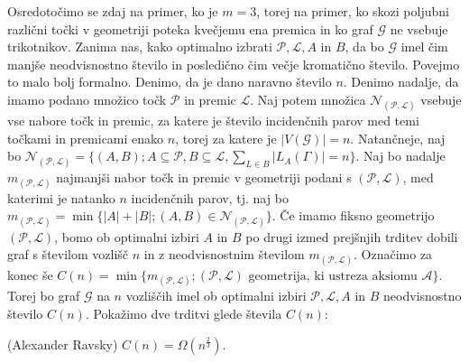 \documentclass[mat1, tisk]{fmfdelo}
\begin{document}
Osredotočimo se zdaj na primer, ko je $m = 3$, torej na primer, ko skozi poljubni različni točki v geometriji poteka kvečjemu ena premica in ko graf $\mathcal{G}$ ne vsebuje trikotnikov. Zanima nas, kako optimalno izbrati $\mathcal{P}, \mathcal{L}, A$ in $B$, da bo $\mathcal{G}$ imel
čim manjše neodvisnostno število in posledično čim večje kromatično število. Povejmo to malo bolj formalno. Denimo, da je dano naravno število $n$. Denimo nadalje, da imamo podano množico točk $\mathcal{P}$ in premic $\mathcal{L}$. Naj potem množica $\mathcal{N}_{(\mathcal{P}, \mathcal{L})}$
vsebuje vse nabore točk in premic, za katere je število incidenčnih parov med temi točkami in premicami enako $n$, torej za katere je $|V(\mathcal{G})| = n$. Natančneje, naj bo $\mathcal{N}_{(\mathcal{P}, \mathcal{L})} = \{(A, B); A \subseteq \mathcal{P}, B \subseteq \mathcal{L}, \sum_{L\in B}|L_A(\Gamma)| = n\}$. 
Naj bo nadalje  $m_{(\mathcal{P}, \mathcal{L})}$ najmanjši nabor točk in premic v geometriji podani s $(\mathcal{P}, \mathcal{L})$, med katerimi je natanko $n$ incidenčnih parov, tj. naj bo $m_{(\mathcal{P}, \mathcal{L})} = \min\{|A|+|B|; (A, B) \in \mathcal{N}_{(\mathcal{P}, \mathcal{L})}\}$. 
Če imamo fiksno geometrijo $(\mathcal{P}, \mathcal{L})$, bomo ob optimalni izbiri $A$ in $B$ po drugi izmed prejšnjih trditev dobili graf s številom vozlišč $n$ in z neodvisnostnim številom $m_{(\mathcal{P}, \mathcal{L})}$. Označimo za konec še 
$C(n) = \min\{m_{(\mathcal{P}, \mathcal{L})}; (\mathcal{P}, \mathcal{L}) \text{ geometrija, ki ustreza aksiomu } \mathcal{A}\}$. Torej bo graf $\mathcal{G}$ na $n$ vozliščih imel ob optimalni izbiri $\mathcal{P}, \mathcal{L}, A \text{ in } B$ neodvisnostno število $C(n)$. Pokažimo dve trditvi glede 
števila $C(n)$:

    \begin{trditev} (Alexander Ravsky)
        $C(n) = \Omega(n^{\frac{2}{3}})$.
    \end{trditev}
\end{document}
